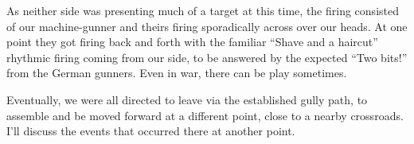 \documentclass[../m3y]{subfiles}
\begin{document}
As neither side was presenting much of a target at this time, the firing consisted of our machine-gunner and theirs firing sporadically across over our heads. At one point they got firing back and forth with the familiar ``Shave and a haircut'' rhythmic firing coming from our side, to be answered by the expected ``Two bits!'' from the German gunners. Even in war, there can be play sometimes.

Eventually, we were all directed to leave via the established gully path, to assemble and be moved forward at a different point, close to a nearby crossroads. I'll discuss the events that occurred there at another point.
\end{document}
